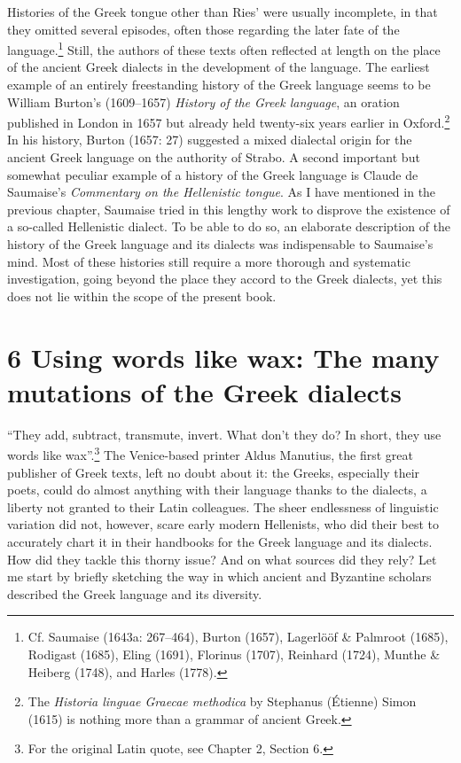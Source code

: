 \begin{styleStandard}
Histories of the Greek tongue other than Ries’ were usually incomplete, in that they omitted several episodes, often those regarding the later fate of the language.\footnote{ Cf. Saumaise (1643a: 267–464), Burton (1657), Lagerlööf \& Palmroot (1685), Rodigast (1685), Eling (1691), Florinus (1707), Reinhard (1724), Munthe \& Heiberg (1748), and Harles (1778).} Still, the authors of these texts often reflected at length on the place of the ancient Greek dialects in the development of the language. The earliest example of an entirely freestanding history of the Greek language seems to be William Burton’s (1609–1657) \textit{History of the Greek language}, an oration published in London in 1657 but already held twenty-six years earlier in Oxford.\footnote{ The \textit{Historia linguae Graecae methodica} by Stephanus (Étienne) Simon (1615) is nothing more than a grammar of ancient Greek.} In his history, Burton (1657: 27) suggested a mixed dialectal origin for the ancient Greek language on the authority of Strabo. A second important but somewhat peculiar example of a history of the Greek language is Claude de Saumaise’s \textit{Commentary on the Hellenistic tongue}. As I have mentioned in the previous chapter, Saumaise tried in this lengthy work to disprove the existence of a so-called Hellenistic dialect. To be able to do so, an elaborate description of the history of the Greek language and its dialects was indispensable to Saumaise’s mind. Most of these histories still require a more thorough and systematic investigation, going beyond the place they accord to the Greek dialects, yet this does not lie within the scope of the present book.
\end{styleStandard}

\clearpage\section[6 Using words like wax: The many mutations of the Greek dialects]{6 Using words like wax: The many mutations of the Greek dialects}
\hypertarget{Toc19704843}{}\begin{styleCatalogusnotities}
“They add, subtract, transmute, invert. What don’t they do? In short, they use words like wax”.\footnote{\textrm{ For the original Latin quote, see Chapter 2, Section 6.}} The Venice-based printer Aldus Manutius, the first great publisher of Greek texts, left no doubt about it: the Greeks, especially their poets, could do almost anything with their language thanks to the dialects, a liberty not granted to their Latin colleagues. The sheer endlessness of linguistic variation did not, however, scare early modern Hellenists, who did their best to accurately chart it in their handbooks for the Greek language and its dialects. How did they tackle this thorny issue? And on what sources did they rely? Let me start by briefly sketching the way in which ancient and Byzantine scholars described the Greek language and its diversity.
\end{styleCatalogusnotities}

